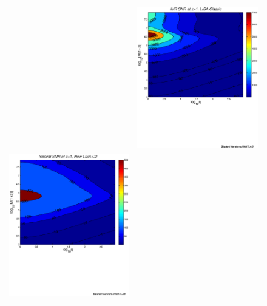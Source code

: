 \documentclass{iopart}
\begin{document}
\begin{figure}[H]
\begin{center}
\begin{tabular}{cc}
&\includegraphics[scale=0.41,clip=true]{FigEmanuele/IMRSNRContourz1.ps}\\
\includegraphics[scale=0.41,clip=true]{FigEmanuele/C2InspSNRContourz1.ps}

\end{tabular}
\end{center}
\end{figure}
\end{document}
